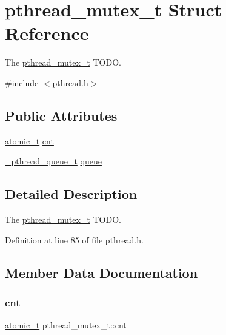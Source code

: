 \hypertarget{structpthread__mutex__t}{}\section{pthread\+\_\+mutex\+\_\+t Struct Reference}
\label{structpthread__mutex__t}


The \mbox{\hyperlink{structpthread__mutex__t}{pthread\+\_\+mutex\+\_\+t}} T\+O\+DO.  




{\ttfamily \#include $<$pthread.\+h$>$}

\subsection*{Public Attributes}
\begin{DoxyCompactItemize}
\item 
\mbox{\hyperlink{thread_8h_a2fac39c4595ddd15ce94cef2a50c8a7b}{atomic\+\_\+t}} \mbox{\hyperlink{structpthread__mutex__t_a03d59d952aa403e3482c071762fd4a1a}{cnt}}
\item 
\mbox{\hyperlink{pthread_8h_a547e924a1dbc72063242456b6390011e}{\+\_\+pthread\+\_\+queue\+\_\+t}} \mbox{\hyperlink{structpthread__mutex__t_ab728fbc3d459db0f6211f3d2efc7155f}{queue}}
\end{DoxyCompactItemize}


\subsection{Detailed Description}
The \mbox{\hyperlink{structpthread__mutex__t}{pthread\+\_\+mutex\+\_\+t}} T\+O\+DO. 

Definition at line 85 of file pthread.\+h.



\subsection{Member Data Documentation}
\mbox{\label{structpthread__mutex__t_a03d59d952aa403e3482c071762fd4a1a}} 
\subsubsection{\texorpdfstring{cnt}{cnt}}
{\footnotesize\ttfamily \mbox{\hyperlink{thread_8h_a2fac39c4595ddd15ce94cef2a50c8a7b}{atomic\+\_\+t}} pthread\+\_\+mutex\+\_\+t\+::cnt}



